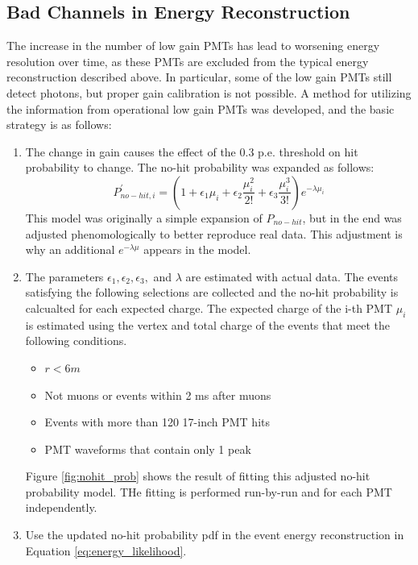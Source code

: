 \subsection*{Bad Channels in Energy Reconstruction}
The increase in the number of low gain PMTs has lead to worsening energy resolution over time, as these PMTs are excluded from the typical energy reconstruction described above. In particular, some of the low gain PMTs still detect photons, but proper gain calibration is not possible. A method for utilizing the information from operational low gain PMTs was developed, and the basic strategy is as follows:
\begin{enumerate}
	\item The change in gain causes the effect of the 0.3 p.e. threshold on hit probability to change. The no-hit probability was expanded as follows:
	\begin{equation}
		P^{\prime}_{no-hit, i} = \left(1+\epsilon_1\mu_i+\epsilon_2\frac{\mu_i^2}{2!}+\epsilon_3\frac{\mu_i^3}{3!}\right)e^{-\lambda\mu_i}
	\end{equation}
	This model was originally a simple expansion of $P_{no-hit}$, but in the end was adjusted phenomologically to better reproduce real data. This adjustment is why an additional $e^{-\lambda\mu}$ appears in the model.
	\item The parameters $\epsilon_1, \epsilon_2, \epsilon_3,$ and $\lambda$ are estimated with actual data. The events satisfying the following selections are collected and the no-hit probability is calcualted for each expected charge. The expected charge of the i-th PMT $\mu_i$ is estimated using the vertex and total charge of the events that meet the following conditions.
	\begin{itemize}
		\item $r<6m$
		\item Not muons or events within 2 ms after muons
		\item Events with more than 120 17-inch PMT hits
		\item PMT waveforms that contain only 1 peak
	\end{itemize}
	Figure \ref{fig:nohit_prob} shows the result of fitting this adjusted no-hit probability model. THe fitting is performed run-by-run and for each PMT independently.
	\item Use the updated no-hit probability pdf in the event energy reconstruction in Equation \ref{eq:energy_likelihood}.
\end{enumerate}
